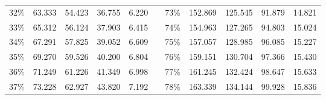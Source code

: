 \documentclass[12pt]{article}
\begin{document}
\begin{center}
\begin{tabular}{|c|r|r|r|r|r|c|r|r|r|r|}
    32\%                      & 63.333                             & 54.423                              & 36.755                              & 6.220                              &                                & 73\%                      & 152.869                            & 125.545                             & 91.879                              & 14.821                             \\ \cline{1-5} \cline{7-11} 
    33\%                      & 65.312                             & 56.124                              & 37.903                              & 6.415                              &                                & 74\%                      & 154.963                            & 127.265                             & 94.803                              & 15.024                             \\ \cline{1-5} \cline{7-11} 
    34\%                      & 67.291                             & 57.825                              & 39.052                              & 6.609                              &                                & 75\%                      & 157.057                            & 128.985                             & 96.085                              & 15.227                             \\ \cline{1-5} \cline{7-11} 
    35\%                      & 69.270                             & 59.526                              & 40.200                              & 6.804                              &                                & 76\%                      & 159.151                            & 130.704                             & 97.366                              & 15.430                             \\ \cline{1-5} \cline{7-11} 
    36\%                      & 71.249                             & 61.226                              & 41.349                              & 6.998                              &                                & 77\%                      & 161.245                            & 132.424                             & 98.647                              & 15.633                             \\ \cline{1-5} \cline{7-11} 
    37\%                      & 73.228                             & 62.927                              & 43.820                              & 7.192                              &                                & 78\%                      & 163.339                            & 134.144                             & 99.928                              & 15.836                             \\ \cline{1-5} \cline{7-11} 

\end{tabular}
\end{center}
\end{document}
